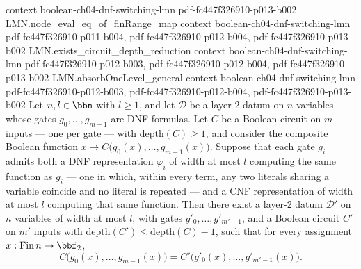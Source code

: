\begin{lemma}
  {context}
  {boolean-ch04-dnf-switching-lmn}
  {pdf-fc447f326910-p013-b002}
\proofstep
  {LMN.node_eval_eq_of_finRange_map}
  {context}
  {boolean-ch04-dnf-switching-lmn}
  {pdf-fc447f326910-p011-b004,
    pdf-fc447f326910-p012-b004,
    pdf-fc447f326910-p013-b002}
\proofstep
  {LMN.exists_circuit_depth_reduction}
  {context}
  {boolean-ch04-dnf-switching-lmn}
  {pdf-fc447f326910-p012-b003,
    pdf-fc447f326910-p012-b004,
    pdf-fc447f326910-p013-b002}
\proofstep
  {LMN.absorbOneLevel_general}
  {context}
  {boolean-ch04-dnf-switching-lmn}
  {pdf-fc447f326910-p012-b003,
    pdf-fc447f326910-p012-b004,
    pdf-fc447f326910-p013-b002}
Let $n, l \in \bbn$ with $l \ge 1$, and let $\mathcal{D}$ be a layer-2 datum on $n$
variables whose gates $g_0, \dots, g_{m-1}$ are DNF formulas. Let $C$ be a Boolean
circuit on $m$ inputs — one per gate — with $\mathrm{depth}(C) \ge 1$, and consider the
composite Boolean function $x \mapsto C\bigl(g_0(x), \dots, g_{m-1}(x)\bigr)$. Suppose
that each gate $g_i$ admits both a DNF representation $\varphi_i$ of width at most $l$
computing the same function as $g_i$ — one in which, within every term, any two literals
sharing a variable coincide and no literal is repeated — and a CNF representation of
width at most $l$ computing that same function. Then there exist a layer-2 datum
$\mathcal{D}'$ on $n$ variables of width at most $l$, with gates $g'_0, \dots,
g'_{m'-1}$, and a Boolean circuit $C'$ on $m'$ inputs with $\mathrm{depth}(C') \le
\mathrm{depth}(C) - 1$, such that for every assignment $x : \mathrm{Fin}\,n \to \bbf_2$,
\[
  C\bigl(g_0(x), \dots, g_{m-1}(x)\bigr) = C'\bigl(g'_0(x), \dots, g'_{m'-1}(x)\bigr).
\]
\end{lemma}
